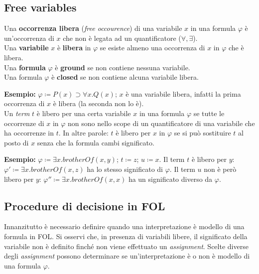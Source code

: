 \subsection{Free variables}
Una \textbf{occorrenza libera} (\textit{free occourence}) di una variabile $x$ in una formula $\varphi$ è un'occorrenza di $x$ che non è legata ad un quantificatore ($\forall, \exists$).
\\

Una \textbf{variabile} $x$ è \textbf{libera} in $\varphi$ se esiste almeno una occorrenza di $x$ in $\varphi$ che è libera.
\\

Una \textbf{formula} $\varphi$ è \textbf{ground} se non contiene nessuna variabile.
\\

Una formula $\varphi$ è \textbf{closed} se non contiene alcuna variabile libera.

\textbf{Esempio: } $\varphi \coloneqq P(x) \supset \forall x. Q(x)$; $x$ è una variabile libera, infatti la prima occorrenza di $x$ è libera (la seconda non lo è).
\\

Un \textit{term} $t$ è libero per una certa variabile $x$ in una formula $\varphi$ se tutte le occorrenze di $x$ in $\varphi$ non sono nello scope di un quantificatore di una variabile che ha occorrenze in $t$. In altre parole: $t$ è libero per $x$ in $\varphi$ se si può sostituire $t$ al posto di $x$ senza che la formula cambi significato.

\textbf{Esempio: } $\varphi \coloneqq \exists x. brotherOf(x, y)$; $t \coloneqq z$; $u \coloneqq x$. Il term $t$ è libero per $y$: $\varphi' \coloneqq \exists x. brotherOf(x, z)$ ha lo stesso significato di $\varphi$. Il term $u$ non è però libero per $y$: $\varphi'' \coloneqq \exists x. brotherOf(x, x)$ ha un significato diverso da $\varphi$.

\subsection{Procedure di decisione in FOL}
Innanzitutto è necessario definire quando una interpretazione è modello di una formula in FOL. Si osservi che, in presenza di variabili libere, il significato della variabile non è definito finché non viene effettuato un \textit{assignment}. Scelte diverse degli \textit{assignment} possono determinare se un'interpretazione è o non è modello di una formula $\varphi$.

